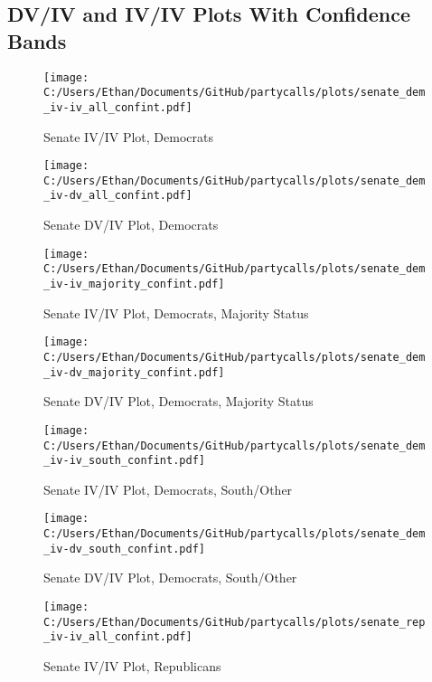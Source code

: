 \documentclass[12pt]{article}
\begin{document}
\pagebreak

\subsection{DV/IV and IV/IV Plots With Confidence Bands}

\begin{figure}[H]
	\centering
	\caption{Senate IV/IV Plot, Democrats}
	\texttt{[image: C:/Users/Ethan/Documents/GitHub/partycalls/plots/senate\_dem\_iv-iv\_all\_confint.pdf]}
\end{figure}

\begin{figure}[H]
	\centering
	\caption{Senate DV/IV Plot, Democrats}
	\texttt{[image: C:/Users/Ethan/Documents/GitHub/partycalls/plots/senate\_dem\_iv-dv\_all\_confint.pdf]}
\end{figure}

\begin{figure}[H]
	\centering
	\caption{Senate IV/IV Plot, Democrats, Majority Status}
	\texttt{[image: C:/Users/Ethan/Documents/GitHub/partycalls/plots/senate\_dem\_iv-iv\_majority\_confint.pdf]}
\end{figure}

\begin{figure}[H]
	\centering
	\caption{Senate DV/IV Plot, Democrats, Majority Status}
	\texttt{[image: C:/Users/Ethan/Documents/GitHub/partycalls/plots/senate\_dem\_iv-dv\_majority\_confint.pdf]}
\end{figure}

\begin{figure}[H]
	\centering
	\caption{Senate IV/IV Plot, Democrats, South/Other}
	\texttt{[image: C:/Users/Ethan/Documents/GitHub/partycalls/plots/senate\_dem\_iv-iv\_south\_confint.pdf]}
\end{figure}

\begin{figure}[H]
	\centering
	\caption{Senate DV/IV Plot, Democrats, South/Other}
	\texttt{[image: C:/Users/Ethan/Documents/GitHub/partycalls/plots/senate\_dem\_iv-dv\_south\_confint.pdf]}
\end{figure}

\begin{figure}[H]
	\centering
	\caption{Senate IV/IV Plot, Republicans}
	\texttt{[image: C:/Users/Ethan/Documents/GitHub/partycalls/plots/senate\_rep\_iv-iv\_all\_confint.pdf]}
\end{figure}
\end{document}
